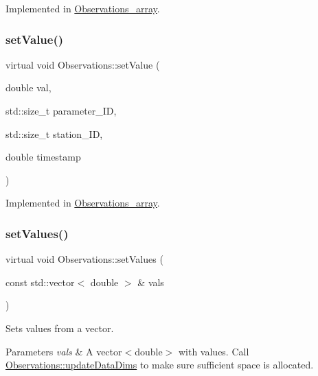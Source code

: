 Implemented in \mbox{\hyperlink{class_observations__array_aa6b6e042f8db0afad3beaff248b4a602}{Observations\+\_\+array}}.

\mbox{\label{class_observations_a6ec8166ad0f141e23a07847ab3646a61}} 
\subsubsection{\texorpdfstring{set\+Value()}{setValue()}\hspace{0.1cm}{\footnotesize\ttfamily [2/2]}}
{\footnotesize\ttfamily virtual void Observations\+::set\+Value (\begin{DoxyParamCaption}\item[{double}]{val,  }\item[{std\+::size\+\_\+t}]{parameter\+\_\+\+ID,  }\item[{std\+::size\+\_\+t}]{station\+\_\+\+ID,  }\item[{double}]{timestamp }\end{DoxyParamCaption})\hspace{0.3cm}{\ttfamily [pure virtual]}}



Implemented in \mbox{\hyperlink{class_observations__array_a3994f0e11a8207c5e1182a9b20a67ec4}{Observations\+\_\+array}}.

\mbox{\label{class_observations_a3aaf49cad714ff61c105d26b4b083ac3}} 
\subsubsection{\texorpdfstring{set\+Values()}{setValues()}}
{\footnotesize\ttfamily virtual void Observations\+::set\+Values (\begin{DoxyParamCaption}\item[{const std\+::vector$<$ double $>$ \&}]{vals }\end{DoxyParamCaption})\hspace{0.3cm}{\ttfamily [pure virtual]}}

Sets values from a vector.


\begin{DoxyParams}{Parameters}
{\em vals} & A vector$<$double$>$ with values. Call \mbox{\hyperlink{class_observations_aab0540879c2d3fdf5f91d30ea2f902fd}{Observations\+::update\+Data\+Dims}} to make sure sufficient space is allocated. \\
\hline
\end{DoxyParams}


